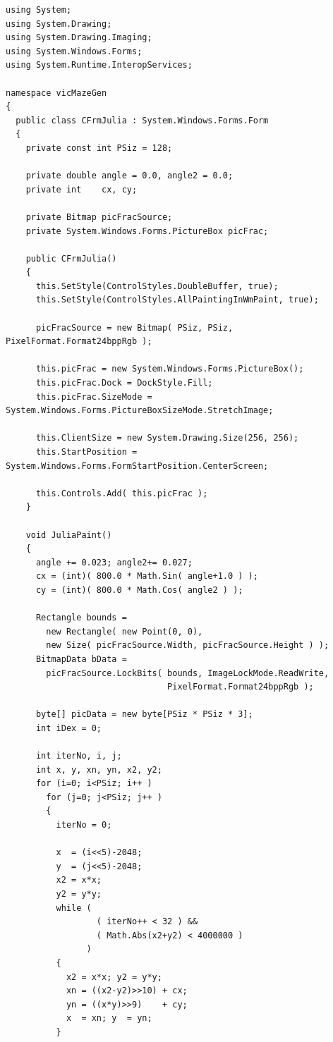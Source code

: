 \begin{scriptsize}
\begin{verbatim}
using System;
using System.Drawing;
using System.Drawing.Imaging;
using System.Windows.Forms;
using System.Runtime.InteropServices; 

namespace vicMazeGen
{
  public class CFrmJulia : System.Windows.Forms.Form
  {
    private const int PSiz = 128;
    
    private double angle = 0.0, angle2 = 0.0;
    private int    cx, cy;

    private Bitmap picFracSource;
    private System.Windows.Forms.PictureBox picFrac;

    public CFrmJulia()
    {
      this.SetStyle(ControlStyles.DoubleBuffer, true);
      this.SetStyle(ControlStyles.AllPaintingInWmPaint, true);

      picFracSource = new Bitmap( PSiz, PSiz, PixelFormat.Format24bppRgb );

      this.picFrac = new System.Windows.Forms.PictureBox();
      this.picFrac.Dock = DockStyle.Fill;
      this.picFrac.SizeMode = System.Windows.Forms.PictureBoxSizeMode.StretchImage;

      this.ClientSize = new System.Drawing.Size(256, 256);
      this.StartPosition = System.Windows.Forms.FormStartPosition.CenterScreen;

      this.Controls.Add( this.picFrac );
    }

    void JuliaPaint()
    {
      angle += 0.023; angle2+= 0.027;
      cx = (int)( 800.0 * Math.Sin( angle+1.0 ) ); 
      cy = (int)( 800.0 * Math.Cos( angle2 ) );

      Rectangle bounds = 
        new Rectangle( new Point(0, 0), 
        new Size( picFracSource.Width, picFracSource.Height ) ); 
      BitmapData bData = 
        picFracSource.LockBits( bounds, ImageLockMode.ReadWrite, 
                                PixelFormat.Format24bppRgb );

      byte[] picData = new byte[PSiz * PSiz * 3];
      int iDex = 0;

      int iterNo, i, j;
      int x, y, xn, yn, x2, y2;
      for (i=0; i<PSiz; i++ )
        for (j=0; j<PSiz; j++ )
        {
          iterNo = 0;
          
          x  = (i<<5)-2048; 
          y  = (j<<5)-2048;
          x2 = x*x;  
          y2 = y*y;
          while ( 
                  ( iterNo++ < 32 ) && 
                  ( Math.Abs(x2+y2) < 4000000 ) 
                )
          {
            x2 = x*x; y2 = y*y;
            xn = ((x2-y2)>>10) + cx;
            yn = ((x*y)>>9)    + cy;
            x  = xn; y  = yn;
          }


\end{verbatim}
\end{scriptsize}
